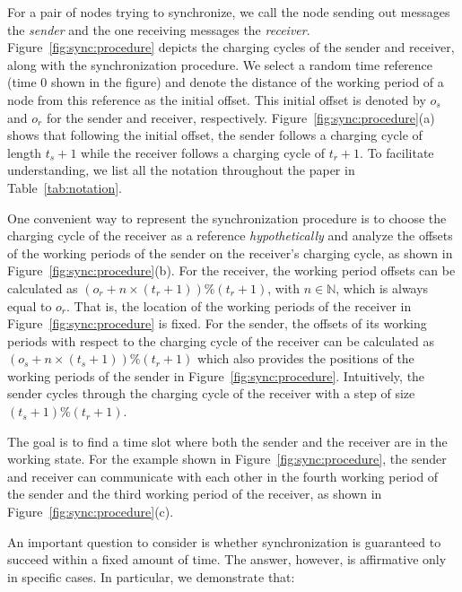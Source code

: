 \documentclass[lettersize,journal]{IEEEtran}
\begin{document}
For a pair of nodes trying to synchronize, we call the node sending out messages the \emph{sender} and the one receiving messages the \emph{receiver}. Figure~\ref{fig:sync:procedure} depicts the charging cycles of the sender and receiver, along with the synchronization procedure. We select a random time reference (time $0$ shown in the figure) and denote the distance of the working period of a node from this reference as the initial offset. This initial offset is denoted by $o_s$ and $o_r$ for the sender and receiver, respectively. Figure~\ref{fig:sync:procedure}(a) shows that following the initial offset, the sender follows a charging cycle of length $t_s+1$ while the receiver follows a charging cycle of $t_r+1$. 
To facilitate understanding, we list all the notation throughout the paper in Table~\ref{tab:notation}.

One convenient way to represent the synchronization procedure is to choose the charging cycle of the receiver as a reference \emph{hypothetically} and analyze the offsets of the working periods of the sender on the receiver's charging cycle, as shown in Figure~\ref{fig:sync:procedure}(b). For the receiver, the working period offsets can be calculated as $(o_r + n \times (t_r + 1)) \% (t_r + 1)$, with $n \in \mathbb{N}$, which is always equal to $o_r$. That is, the location of the working periods of the receiver in Figure~\ref{fig:sync:procedure} is fixed. For the sender, the offsets of its working periods with respect to the charging cycle of the receiver can be calculated as  $(o_s + n \times (t_s + 1)) \% (t_r + 1)$ which also provides the positions of the working periods of the sender in Figure~\ref{fig:sync:procedure}. Intuitively, the sender cycles through the charging cycle of the receiver with a step of size $(t_s + 1) \% (t_r + 1)$. 

The goal is to find a time slot where both the sender and the receiver are in the working state. For the example shown in Figure~\ref{fig:sync:procedure}, the sender and receiver can communicate with each other in the fourth working period of the sender and the third working period of the receiver, as shown in Figure~\ref{fig:sync:procedure}(c).

An important question to consider is whether synchronization is guaranteed to succeed within a fixed amount of time. The answer, however, is affirmative only in specific cases. In particular, we demonstrate that:
\end{document}
